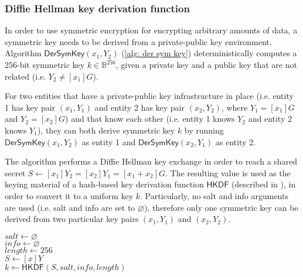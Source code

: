 \clearpage
\subsubsection{Diffie Hellman key derivation function} \label{app: diffie hellman key derivation function}
In order to use symmetric encryption for encrypting arbitrary amounts of data, a symmetric key needs to be derived from a private-public key environment. Algorithm $\mathsf{DerSymKey}(x_1, Y_2)$ (\cref{alg: der sym key}) deterministically computes a 256-bit symmetric key $k \in \mathbb{B}^{256}$, given a private key and a public key that are not related (i.e. $Y_2 \neq [x_1]G$).

For two entities that have a private-public key infrastructure in place (i.e. entity 1 has key pair $(x_1, Y_1)$ and entity 2 has key pair $(x_2, Y_2)$, where $Y_1 = [x_1]G$ and $Y_2 = [x_2]G$) and that know each other (i.e. entity 1 knows $Y_2$ and entity 2 knows $Y_1$), they can both derive symmetric key $k$ by running $\mathsf{DerSymKey}(x_1, Y_2)$ as entity 1 and $\mathsf{DerSymKey}(x_2, Y_1)$ as entity 2.

The algorithm performs a Diffie Hellman key exchange in order to reach a shared secret $S \gets [x_1]Y_2 = [x_2]Y_1 = [x_1 + x_2]G$. The resulting value is used as the keying material of a hash-based key derivation function $\mathsf{HKDF}$ (described in \cite{RFC5869}), in order to convert it to a uniform key $k$. Particularly, no salt and info arguments are used (i.e. salt and info are set to $\varnothing$), therefore only one symmetric key can be derived from two particular key pairs $(x_1, Y_1)$ and $(x_2, Y_2)$.

\begin{algorithm}[ht]
    \DontPrintSemicolon
    \caption{$\mathsf{DerSymKey}(x, Y)$}
    \label{alg: der sym key}
    
    $salt \gets \varnothing$ \\
    $info \gets \varnothing$ \\
    $length \gets 256$ \\
    $S \gets [x]Y$ \\
    $k \gets \mathsf{HKDF}(S, salt, info, length)$ \\
     
\end{algorithm}

